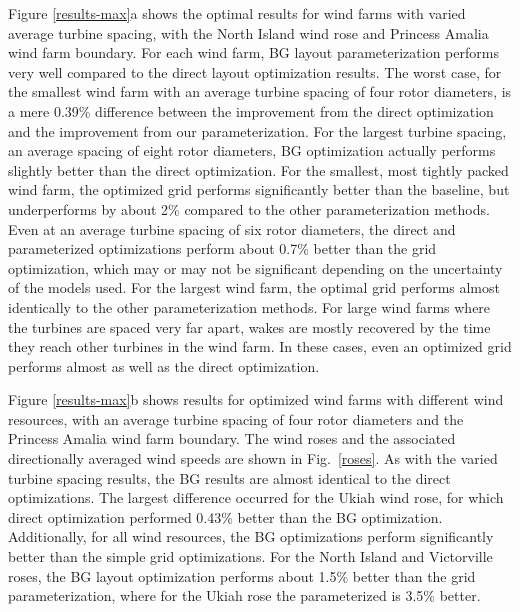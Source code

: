 \documentclass[wes, manuscript]{copernicus}
\begin{document}
Figure \ref{results-max}a shows the optimal results for wind farms with varied average turbine spacing, with the North Island wind rose and Princess Amalia wind farm boundary. For each wind farm, BG layout parameterization performs very well compared to the direct layout optimization results. The worst case, for the smallest wind farm with an average turbine spacing of four rotor diameters, is a mere 0.39\% difference between the improvement from the direct optimization and the improvement from our parameterization. For the largest turbine spacing, an average spacing of eight rotor diameters, BG optimization actually performs slightly better than the direct optimization.
For the smallest, most tightly packed wind farm, the optimized grid performs significantly better than the baseline, but underperforms by about 2\% compared to the other parameterization methods. Even at an average turbine spacing of six rotor diameters, the direct and parameterized optimizations perform about 0.7\% better than the grid optimization, which may or may not be significant depending on the uncertainty of the models used. For the largest wind farm, the optimal grid performs almost identically to the other parameterization methods. For large wind farms where the turbines are spaced very far apart, wakes are mostly recovered by the time they reach other turbines in the wind farm. In these cases, even an optimized grid performs almost as well as the direct optimization.  

Figure \ref{results-max}b shows results for optimized wind farms with different wind resources, with an average turbine spacing of four rotor diameters and the Princess Amalia wind farm boundary. The wind roses and the associated directionally averaged wind speeds are shown in Fig.~\ref{roses}. 
%
As with the varied turbine spacing results, the BG results are almost identical to the direct optimizations. The largest difference occurred for the Ukiah wind rose, for which direct optimization performed 0.43\% better than the BG optimization. Additionally, for all wind resources, the BG optimizations perform significantly better than the simple grid optimizations. For the North Island and Victorville roses, the BG layout optimization performs about 1.5\% better than the grid parameterization, where for the Ukiah rose the parameterized is 3.5\% better.
\end{document}
